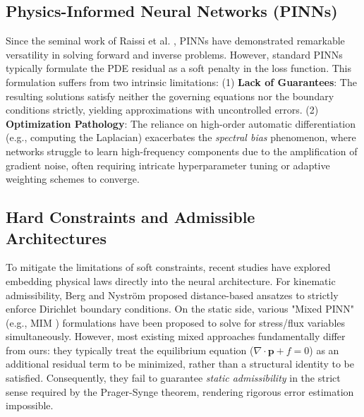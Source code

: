 \documentclass[12pt, a4paper]{article}
\begin{document}
\subsection{Physics-Informed Neural Networks (PINNs)}
Since the seminal work of Raissi et al. \cite{raissi2019}, PINNs have demonstrated remarkable versatility in solving forward and inverse problems. However, standard PINNs typically formulate the PDE residual as a soft penalty in the loss function. This formulation suffers from two intrinsic limitations: (1) \textbf{Lack of Guarantees}: The resulting solutions satisfy neither the governing equations nor the boundary conditions strictly, yielding approximations with uncontrolled errors. (2) \textbf{Optimization Pathology}: The reliance on high-order automatic differentiation (e.g., computing the Laplacian) exacerbates the \textit{spectral bias} phenomenon\cite{rahaman2019spectral}, where networks struggle to learn high-frequency components due to the amplification of gradient noise, often requiring intricate hyperparameter tuning or adaptive weighting schemes to converge.

\subsection{Hard Constraints and Admissible Architectures}
To mitigate the limitations of soft constraints, recent studies have explored embedding physical laws directly into the neural architecture\cite{lagaris1998artificial}. For kinematic admissibility, Berg and Nyström \cite{berg2018unified} proposed distance-based ansatzes to strictly enforce Dirichlet boundary conditions. On the static side, various "Mixed PINN"(e.g., MIM \cite{lyu2022mim}) formulations have been proposed to solve for stress/flux variables simultaneously. However, most existing mixed approaches fundamentally differ from ours: they typically treat the equilibrium equation ($\nabla \cdot \mathbf{p} + f = 0$) as an additional residual term to be minimized, rather than a structural identity to be satisfied. Consequently, they fail to guarantee \textit{static admissibility} in the strict sense required by the Prager-Synge theorem, rendering rigorous error estimation impossible.
\end{document}
